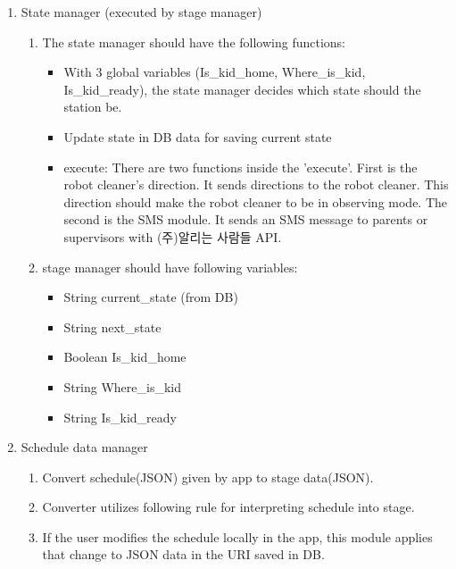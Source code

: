\documentclass[conference]{IEEEtran}
\begin{document}
\begin{enumerate}[label=\arabic*.]
\begin{enumerate}[label=\arabic*.]
\begin{enumerate}[label=\alph*.]
\begin{enumerate}[label=\roman*.]
        \end{enumerate}
        \item {\large{State manager (executed by stage manager)}} \\
        \begin{enumerate}[label=\roman*.]
            \item {\large{The state manager should have the following functions: }}
            \begin{itemize}
                \item {With 3 global variables (Is\_kid\_home, Where\_is\_kid, Is\_kid\_ready), the state manager decides which state should the station be.}
                \item {Update state in DB data for saving current state }
                \item {execute: There are two functions inside the 'execute'. First is the robot cleaner's direction. It sends directions to the robot cleaner. This direction should make the robot cleaner to be in observing mode. The second is the SMS module. It sends an SMS message to parents or supervisors with (주)알리는 사람들 API. } \\
            \end{itemize}
            \item {\large{stage manager should have following variables: }}
             \begin{itemize}
                \item {String current\_state (from DB)}
                \item {String next\_state}
                \item {Boolean Is\_kid\_home}
                \item {String Where\_is\_kid}
                \item {String Is\_kid\_ready} \\     
            \end{itemize}
        \end{enumerate}
        \item {\large{Schedule data manager}} \\
        \begin{enumerate}[label=\roman*.]
            \item {\large{Convert schedule(JSON) given by app to stage data(JSON).}} 
            \item {\large{Converter utilizes following rule for interpreting schedule into stage.}} 
            \item {\large{If the user modifies the schedule locally in the app, this module applies that change to JSON data in the URI saved in DB.}} \\

\end{enumerate}
\end{enumerate}
\end{enumerate}
\end{enumerate}
\end{document}
